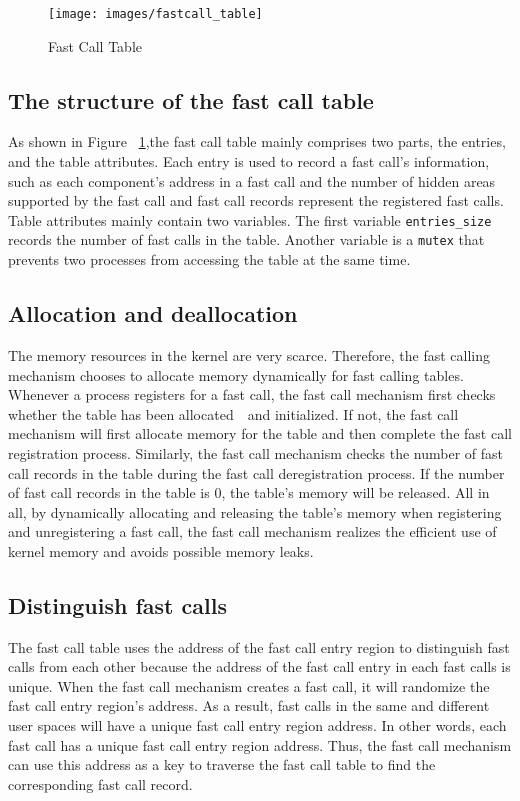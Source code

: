 \begin{figure}[tbp]
  \centering
  \texttt{[image: images/fastcall\_table]}
  \caption[Short description]{Fast Call Table}
  \label{fig:fastcall_table}
\end{figure}

\subsection{The structure of the fast call table}
As shown in Figure ~\ref{fig:fastcall_table},the fast call table mainly comprises two parts, 
the entries, and the table attributes. 
Each entry is used to record a fast call's information, 
such as each component's address in a fast call and the number of 
hidden areas supported by the fast call and fast call records represent the registered fast calls. Table attributes mainly 
contain two variables. The first variable \verb|entries_size| 
records the number of fast calls in the table. Another variable is a 
\verb|mutex| that prevents two processes from accessing the table at the same time.

\subsection{Allocation and deallocation}
The memory resources in the kernel are very scarce. 
Therefore, the fast calling mechanism chooses to allocate memory dynamically for fast calling tables. Whenever a process registers for a fast call, the fast call mechanism 
first checks whether the table has been allocated　and initialized. If not, the fast call mechanism will first allocate memory for the table and then complete the fast call registration process.
Similarly, the fast call mechanism checks the number of fast call records in the table during the fast call deregistration process. If the number of fast call records in the table is 0, the table's memory will be released.
All in all, by dynamically allocating and releasing the table's memory when registering and unregistering a fast call, the fast call mechanism realizes the efficient use of kernel memory and avoids possible memory leaks. 

\subsection{Distinguish fast calls}
The fast call table uses the address of the fast call entry region to distinguish 
fast calls from each other because the address of the fast call entry in each fast calls is unique.
When the fast call mechanism creates a fast call, it will randomize the fast call entry 
region's address. As a result, fast calls in the same and different user spaces will
have a unique fast call entry region address. In other words, 
each fast call has a unique fast call entry region address. Thus, the fast call mechanism 
can use this address as a key to traverse the fast call table to find the corresponding 
fast call record.



